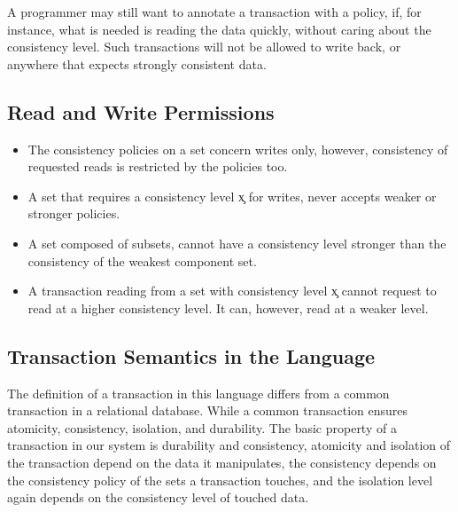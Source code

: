 A programmer may still want to annotate a transaction with a policy, if, for
instance, what is needed is reading the data quickly, without caring about the
consistency level. Such transactions will not be allowed to write back, or
anywhere that expects strongly consistent data.

%

\subsection{Read and Write Permissions}

\begin{itemize}

\item The consistency policies on a set concern writes only, however,
consistency of requested reads is restricted by the policies too.

\item A set that requires a consistency level \c{x} for writes, never accepts weaker or
stronger policies.

\item A set composed of subsets, cannot have a consistency level stronger than
the consistency of the weakest component set.

\item A transaction reading from a set with consistency level \c{x} cannot request
to read at a higher consistency level. It can, however, read at a weaker level.

\end{itemize}

\subsection{Transaction Semantics in the Language}
The definition of a transaction in this language differs from a common transaction in a
relational database. While a common transaction ensures atomicity, consistency,
isolation,
 and durability. The basic property of a transaction in our system is
durability and consistency, atomicity and isolation of the transaction depend on
the data it manipulates, the consistency depends on the consistency policy of
the sets a transaction touches, and the isolation level again depends on the
consistency level of touched data. \\

